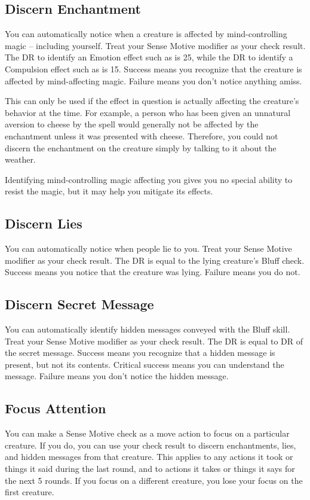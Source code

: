     \subsection{Discern Enchantment}
        You can automatically notice when a creature is affected by mind-controlling magic -- including yourself. Treat your Sense Motive modifier as your check result. The DR to identify an Emotion effect such as  is 25, while the DR to identify a Compulsion effect such as  is 15. Success means you recognize that the creature is affected by mind-affecting magic. Failure means you don't notice anything amiss.

        This can only be used if the effect in question is actually affecting the creature's behavior at the time. For example, a person who has been given an unnatural aversion to cheese by the  spell would generally not be affected by the enchantment unless it was presented with cheese. Therefore, you could not discern the enchantment on the creature simply by talking to it about the weather.

        Identifying mind-controlling magic affecting you gives you no special ability to resist the magic, but it may help you mitigate its effects.

    \subsection{Discern Lies}
        You can automatically notice when people lie to you. Treat your Sense Motive modifier as your check result. The DR is equal to the lying creature's Bluff check. Success means you notice that the creature was lying. Failure means you do not.

    \subsection{Discern Secret Message}
        You can automatically identify hidden messages conveyed with the Bluff skill. Treat your Sense Motive modifier as your check result. The DR is equal to DR of the secret message. Success means you recognize that a hidden message is present, but not its contents. Critical success means you can understand the message. Failure means you don't notice the hidden message.

    \subsection{Focus Attention}
        You can make a Sense Motive check as a move action to focus on a particular creature. If you do, you can use your check result to discern enchantments, lies, and hidden messages from that creature. This applies to any actions it took or things it said during the last round, and to actions it takes or things it says for the next 5 rounds. If you focus on a different creature, you lose your focus on the first creature.

